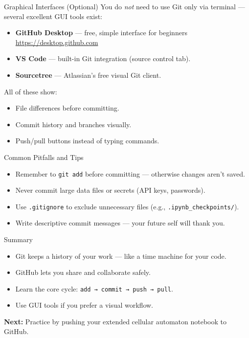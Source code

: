 \documentclass[aspectratio=169,13pt]{beamer}
\begin{document}
\begin{frame}{Graphical Interfaces (Optional)}
    You do \emph{not} need to use Git only via terminal — several excellent GUI tools exist:

    \begin{itemize}
        \item \textbf{GitHub Desktop} — free, simple interface for beginners
              \url{https://desktop.github.com}
        \item \textbf{VS Code} — built-in Git integration (source control tab).
        \item \textbf{Sourcetree} — Atlassian’s free visual Git client.
    \end{itemize}

    \vspace{0.5em}
    All of these show:
    \begin{itemize}
        \item File differences before committing.
        \item Commit history and branches visually.
        \item Push/pull buttons instead of typing commands.
    \end{itemize}
\end{frame}

\begin{frame}{Common Pitfalls and Tips}
    \begin{itemize}
        \item Remember to \texttt{git add} before committing — otherwise changes aren’t saved.
        \item Never commit large data files or secrets (API keys, passwords).
        \item Use \texttt{.gitignore} to exclude unnecessary files (e.g., \texttt{.ipynb\_checkpoints/}).
        \item Write descriptive commit messages — your future self will thank you.
    \end{itemize}
\end{frame}

\begin{frame}{Summary}
    \begin{itemize}
        \item Git keeps a history of your work — like a time machine for your code.
        \item GitHub lets you share and collaborate safely.
        \item Learn the core cycle: \texttt{add → commit → push → pull}.
        \item Use GUI tools if you prefer a visual workflow.
    \end{itemize}

    \vspace{1em}
    \begin{center}
        \textbf{Next:} Practice by pushing your extended cellular automaton notebook to GitHub.
    \end{center}
\end{frame}
\end{document}
